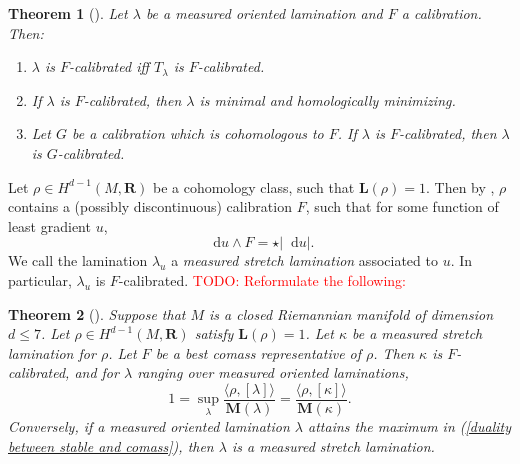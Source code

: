 \documentclass[reqno,11pt]{amsart}
\newcommand{\RR}{\mathbf{R}}
\newcommand*\dif{\mathop{}\!\mathrm{d}}
\newcommand{\Chain}{\underline C}
\newcommand{\Mass}{\mathbf M}
\newcommand{\Comass}{\mathbf L}
\newcommand{\dfn}[1]{\emph{#1}\index{#1}}
\newtheorem{theorem}{Theorem}[section]
\theoremstyle{definition}
\newtheorem{definition}[theorem]{Definition}
\numberwithin{equation}{section}
\newcommand\todo[1]{\textcolor{red}{TODO: #1}}
\begin{document}
\begin{theorem}[{\cite[\S4.1]{BackusBest1}}]\label{properties of calibrated laminations}
Let $\lambda$ be a measured oriented lamination and $F$ a calibration.
Then:
\begin{enumerate}
\item $\lambda$ is $F$-calibrated iff $T_\lambda$ is $F$-calibrated.
\item If $\lambda$ is $F$-calibrated, then $\lambda$ is minimal and homologically minimizing.
\item Let $G$ be a calibration which is cohomologous to $F$. If $\lambda$ is $F$-calibrated, then $\lambda$ is $G$-calibrated.
\end{enumerate}
\end{theorem}

Let $\rho \in H^{d - 1}(M, \RR)$ be a cohomology class, such that $\Comass(\rho) = 1$.
Then by \cite[Theorem 1.1]{BackusBest1}, $\rho$ contains a (possibly discontinuous) calibration $F$, such that for some function of least gradient $u$,
\begin{equation}\label{duality of least and tight}
\dif u \wedge F = \star |\dif u|.
\end{equation}
We call the lamination $\lambda_u$ a \dfn{measured stretch lamination} associated to $u$.
In particular, $\lambda_u$ is $F$-calibrated.
\todo{Reformulate the following:}

\begin{theorem}[{\cite[Theorem B]{BackusBest1}}]\label{lams are calibrated}\label{calibrated means measured stretch}
Suppose that $M$ is a closed Riemannian manifold of dimension $d \leq 7$.
Let $\rho \in H^{d - 1}(M, \RR)$ satisfy $\Comass(\rho) = 1$.
Let $\kappa$ be a measured stretch lamination for $\rho$.
Let $F$ be a best comass representative of $\rho$.
Then $\kappa$ is $F$-calibrated, and for $\lambda$ ranging over measured oriented laminations,
\begin{equation}\label{duality between stable and comass}
1 = \sup_\lambda \frac{\langle \rho, [\lambda]\rangle}{\Mass(\lambda)} = \frac{\langle \rho, [\kappa]\rangle}{\Mass(\kappa)}.
\end{equation}
Conversely, if a measured oriented lamination $\lambda$ attains the maximum in (\ref{duality between stable and comass}), then $\lambda$ is a measured stretch lamination.
\end{theorem}

\end{document}
